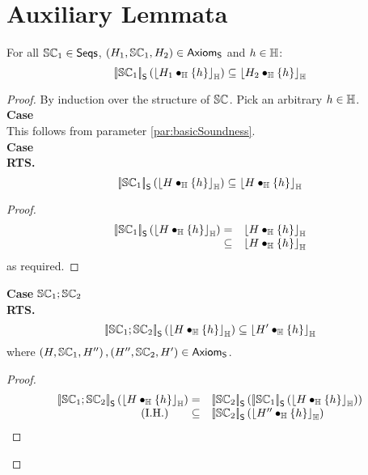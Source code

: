 \section*{Auxiliary Lemmata}
\begin{lemma}\label{lem:seqSoundness}
For all $\mathbb{SC}_{1} \in \textsf{Seqs}$, $\left(H_1, \mathbb{SC}_{1}, H_2\right) \in \textsf{Axiom}_{\textsf{S}}$ and $h \in \mathbb{H}$:
%
\[
	\left[\!\left| \mathbb{SC}_{1} \right |\! \right]_{\textsf{S}}\left( \left\lfloor H_1 \bullet_{\mathbb{H}} \{h\} \right\rfloor_{\mathbb{H}} \right) \subseteq \left\lfloor H_2 \bullet_{\mathbb{H}} \{h\} \right\rfloor_{\mathbb{H}}
\]
%
\begin{proof}
By induction over the structure of $\mathbb{SC}_{}$. Pick an arbitrary $h \in \mathbb{H}$.\\

\noindent\textbf{Case \hspace*{0.3cm}}\bc{}\\
This follows from parameter \ref{par:basicSoundness}.\\


\noindent\textbf{Case \hspace*{0.3cm}\skipC}\\
\textbf{RTS.}
%
\[
	\left[\!\left| \mathbb{SC}_{1} \right |\! \right]_{\textsf{S}}\left( \left\lfloor H \bullet_{\mathbb{H}} \{h\} \right\rfloor_{\mathbb{H}} \right) 
	\subseteq \left\lfloor H \bullet_{\mathbb{H}} \{h\} \right\rfloor_{\mathbb{H}}
\]
%
\begin{proof}
%
\[
\begin{array}{r l}
	\left[\!\left| \mathbb{SC}_{1} \right |\! \right]_{\textsf{S}}\left( \left\lfloor H \bullet_{\mathbb{H}} \{h\} \right\rfloor_{\mathbb{H}} \right) 
	= &
	\left\lfloor H \bullet_{\mathbb{H}} \{h\} \right\rfloor_{\mathbb{H}}\\

	\subseteq & \left\lfloor H \bullet_{\mathbb{H}} \{h\} \right\rfloor_{\mathbb{H}}
\end{array}
\]
%
as required.
\renewcommand{\qed}{}
\end{proof}
%
%

\noindent\textbf{Case \hspace*{0.3cm}}$\mathbb{SC}_{1} ; \mathbb{SC}_{2}$\\
\textbf{RTS.}
%
\[
	\left[\!\left| \mathbb{SC}_{1}; \mathbb{SC}_{2} \right |\! \right]_{\textsf{S}}\left( \left\lfloor H \bullet_{\mathbb{H}} \{h\} \right\rfloor_{\mathbb{H}} \right) 
	\subseteq \left\lfloor H' \bullet_{\mathbb{H}} \{h\} \right\rfloor_{\mathbb{H}}
\]
%
where $\left(H, \mathbb{SC}_{1}, H'' \right), \left(H'', \mathbb{SC}_{2}, H' \right)  \in \textsf{Axiom}_{\textsf{S}}$.
\begin{proof}
%
\[
\begin{array}{r l}
	
	\opSemSeq{\seq{1}; \seq{2}}{\reifyH{H \composeH \{h\}}} 
	= &  
	\opSemSeq{\seq{2}}{ \opSemSeq{\seq{1}}{\reifyH{H \composeH \{h\}}}}\\

	\text{(I.H.) \hspace*{0.5cm}}
	\subseteq &
	\opSemSeq{\seq{2}}{\reifyH{H'' \composeH \{h\}}}\\
	

\end{array}\]
\end{proof}
\end{proof}
\end{lemma}
